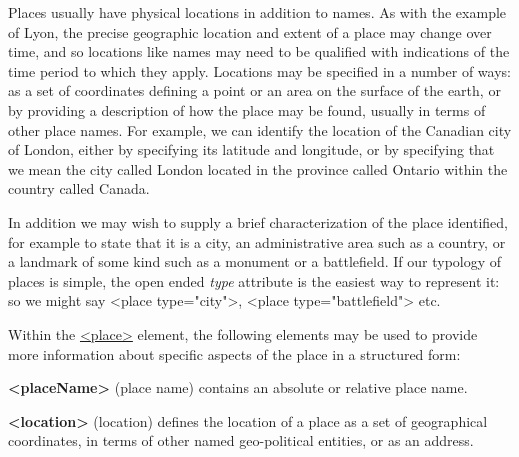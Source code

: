 Places usually have physical locations in addition to names. As with the example of Lyon, the precise geographic location and extent of a place may change over time, and so locations like names may need to be qualified with indications of the time period to which they apply. Locations may be specified in a number of ways: as a set of coordinates defining a point or an area on the surface of the earth, or by providing a description of how the place may be found, usually in terms of other place names. For example, we can identify the location of the Canadian city of London, either by specifying its latitude and longitude, or by specifying that we mean the city called London located in the province called Ontario within the country called Canada.\par
In addition we may wish to supply a brief characterization of the place identified, for example to state that it is a city, an administrative area such as a country, or a landmark of some kind such as a monument or a battlefield. If our typology of places is simple, the open ended {\itshape type} attribute is the easiest way to represent it: so we might say <place type="city">, <place type="battlefield"> etc.\par
Within the \hyperref[TEI.place]{<place>} element, the following elements may be used to provide more information about specific aspects of the place in a structured form: 
\begin{sansreflist}
  
\item [\textbf{<placeName>}] (place name) contains an absolute or relative place name.
\item [\textbf{<location>}] (location) defines the location of a place as a set of geographical coordinates, in terms of other named geo-political entities, or as an address.
\end{sansreflist}

